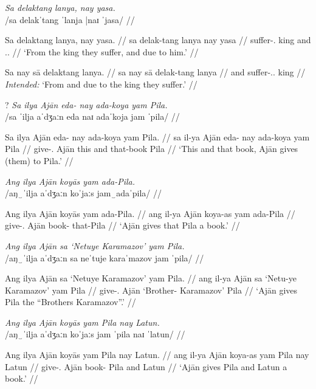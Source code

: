 \documentclass[12pt,a4paper]{scrartcl}
\newcommand{\TsgM}{{\Tsg}.{\M}}
\newcommand{\TplM}{{\Tpl}.{\M}}
\begin{document}
\pex
\a\begingl
\glpreamble \textit{Sa delaktang lanya, nay yasa.} \\
	/sa delakˈtang ˈlanja |naɪ ˈjasa/ //

\gla Sa delaktang lanya, nay yasa. //
\glb sa delak-tang lanya nay yasa //
\glc \PatT{} suffer-\TplM{} king and \TsgM{}.\Caus{} //
\glft `From the king they suffer, and due to him.' //
\endgl

\a\ljudge*\begingl
\gla Sa nay sā delaktang lanya. //
\glb sa nay sā delak-tang lanya //
\glc \PatT{} and \CauT{} suffer-\TplM{}.\Aarg{} king //
\glft \textit{Intended:} `From and due to the king they suffer.' //
\endgl

\xe

\ex\ljudge?\begingl
\glpreamble \textit{Sa ilya Ajān eda- nay ada-koya yam Pila.}\\
	/sa ˈilja aˈdʒaːn eda naɪ adaˈkoja jam ˈpila/ //

\gla Sa ilya Ajān eda- nay ada-koya yam Pila. //
\glb sa il-ya Ajān eda- nay ada-koya yam Pila //
\glc \PatT{} give-\TsgM{} Ajān this and that-book \Dat{} Pila //
\glft `This and that book, Ajān gives (them) to Pila.' //
\endgl\xe

\ex\begingl
\glpreamble \textit{Ang ilya Ajān koyās yam ada-Pila.}\\
	/aŋ‿ˈilja aˈdʒaːn koˈjaːs jam‿adaˈpila/ //

\gla Ang ilya Ajān koyās yam ada-Pila. //
\glb ang il-ya Ajān koya-as yam ada-Pila //
\glc \AgtT{} give-\TsgM{} Ajān book-\Parg{} \Dat{} that-Pila //
\glft `Ajān gives that Pila a book.' //
\endgl\xe

\ex\begingl
\glpreamble \textit{Ang ilya Ajān sa `Netuye Karamazov' yam Pila.}\\
	/aŋ‿ˈilja aˈdʒaːn sa neˈtuje karaˈmazov jam ˈpila/ //

\gla Ang ilya Ajān sa `Netuye Karamazov' yam Pila. //
\glb ang il-ya Ajān sa `Netu-ye Karamazov' yam Pila //
\glc \AgtT{} give-\TsgM{} Ajān \Parg{} `Brother-\Pl{} Karamazov' \Dat{} Pila //
\glft `Ajān gives Pila the “Brothers Karamazov”.' //
\endgl\xe

\ex\begingl
\glpreamble \textit{Ang ilya Ajān koyās yam Pila nay Latun.}\\
	/aŋ‿ˈilja aˈdʒaːn koˈjaːs jam ˈpila naɪ ˈlatun/ //

\gla Ang ilya Ajān koyās yam Pila nay Latun. //
\glb ang il-ya Ajān koya-as yam Pila nay Latun //
\glc \AgtT{} give-\TsgM{} Ajān book-\Parg{} \Dat{} Pila and Latun //
\glft `Ajān gives Pila and Latun a book.' //
\endgl\xe
\end{document}
